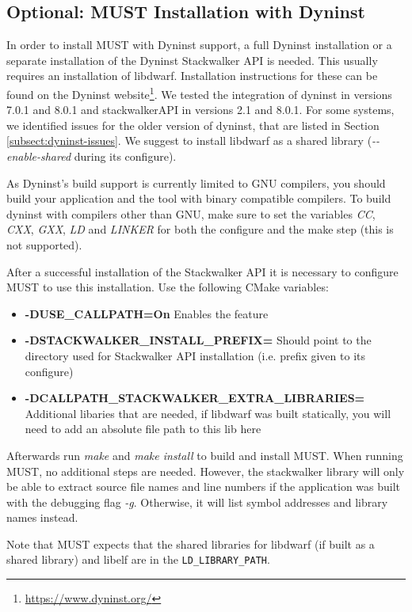 \documentclass[english]{scrartcl}
\begin{document}
\subsection{Optional: MUST Installation with Dyninst}
\label{section:dyninst}
In order to install MUST with Dyninst support, a full Dyninst installation or a
separate installation of the Dyninst Stackwalker API is needed. This usually
requires an installation of libdwarf. Installation instructions for these can be
found on the Dyninst website\footnote{\url{https://www.dyninst.org/}}. We tested the integration of dyninst in versions 7.0.1 and 8.0.1 and stackwalkerAPI in versions 2.1 and 8.0.1.
For some systems, we identified issues for the older version of dyninst, 
that are listed in Section \ref{subsect:dyninst-issues}. 
We suggest to
install libdwarf as a shared library (\emph{\mbox{-{}-}enable-shared} during its
configure).

As Dyninst's build support is currently limited to GNU compilers, you should 
build your application and the tool with binary compatible compilers. 
To build dyninst 
with compilers other than GNU, make sure to set the variables \emph{CC}, \emph{CXX}, 
\emph{GXX}, \emph{LD} and \emph{LINKER} for both the configure and the make step 
(this is not supported).

After a successful installation of the Stackwalker API it is necessary
to configure MUST to use this installation. Use the following CMake variables:
\begin{itemize}
  \item \textbf{-DUSE\_CALLPATH=On} Enables the feature
  \item \textbf{-DSTACKWALKER\_INSTALL\_PREFIX=} Should point to the 
  directory used for Stackwalker API installation (i.e. prefix given to its
  configure)
  \item \textbf{-DCALLPATH\_STACKWALKER\_EXTRA\_LIBRARIES=} Additional libaries
  that are needed, if libdwarf was built statically, you will need to add an
  absolute file path to this lib here
\end{itemize}

Afterwards run \emph{make} and \emph{make install} to build and install MUST.
When running MUST, no additional steps are needed. However, the stackwalker
library will only be able to extract source file names and line numbers if the
application was built with the debugging flag \emph{-g}. Otherwise, it will list
symbol addresses and library names instead.

Note that MUST expects that the shared libraries for libdwarf (if built as a shared library) 
and libelf are in the \texttt{LD\_LIBRARY\_PATH}.
\end{document}
